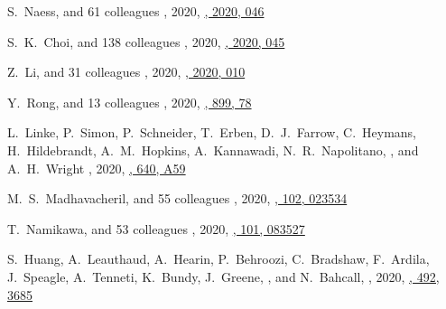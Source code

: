 \begin{etaremune}
\item
S.~Naess, and 61 colleagues
,
2020, \href{https://ui.adsabs.harvard.edu/abs/2020JCAP...12..046N}{\jcap, 2020, 046}

\item
S.~K.~Choi, and 138 colleagues
,
2020, \href{https://ui.adsabs.harvard.edu/abs/2020JCAP...12..045C}{\jcap, 2020, 045}

\item
Z.~Li, and 31 colleagues
,
2020, \href{https://ui.adsabs.harvard.edu/abs/2020JCAP...09..010L}{\jcap, 2020, 010}

\item
Y.~Rong, and 13 colleagues
,
2020, \href{https://ui.adsabs.harvard.edu/abs/2020ApJ...899...78R}{\apj, 899, 78}

\item
L.~Linke, P.~Simon, P.~Schneider, T.~Erben, D.~J.~Farrow, C.~Heymans, H.~Hildebrandt, A.~M.~Hopkins, A.~Kannawadi, N.~R.~Napolitano, \myself, and A.~H.~Wright
,
2020, \href{https://ui.adsabs.harvard.edu/abs/2020A&A...640A..59L}{\aap, 640, A59}

\item
M.~S.~Madhavacheril, and 55 colleagues
,
2020, \href{https://ui.adsabs.harvard.edu/abs/2020PhRvD.102b3534M}{\prd, 102, 023534}

\item
T.~Namikawa, and 53 colleagues
,
2020, \href{https://ui.adsabs.harvard.edu/abs/2020PhRvD.101h3527N}{\prd, 101, 083527}

\item
S.~Huang, A.~Leauthaud, A.~Hearin, P.~Behroozi, C.~Bradshaw, F.~Ardila, J.~Speagle, A.~Tenneti, K.~Bundy, J.~Greene, \myself, and N.~Bahcall,
,
2020, \href{https://ui.adsabs.harvard.edu/abs/2020MNRAS.492.3685H}{\mnras, 492, 3685}


\end{etaremune}
